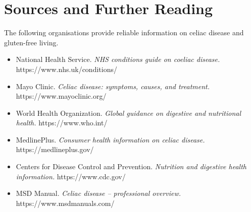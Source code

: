 \section*{Sources and Further Reading}
The following organisations provide reliable information on celiac disease and gluten-free living.

\begin{itemize}
    \item National Health Service. \textit{NHS conditions guide on coeliac disease.} https://www.nhs.uk/conditions/
    \item Mayo Clinic. \textit{Celiac disease: symptoms, causes, and treatment.} https://www.mayoclinic.org/
    \item World Health Organization. \textit{Global guidance on digestive and nutritional health.} https://www.who.int/
    \item MedlinePlus. \textit{Consumer health information on celiac disease.} https://medlineplus.gov/
    \item Centers for Disease Control and Prevention. \textit{Nutrition and digestive health information.} https://www.cdc.gov/
    \item MSD Manual. \textit{Celiac disease -- professional overview.} https://www.msdmanuals.com/
\end{itemize}
